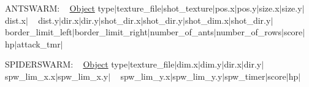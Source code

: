 ANTSWARM\+: ~\newline
 \mbox{\hyperlink{classObject}{Object}} type$\vert$texture\+\_\+file$\vert$shot\+\_\+texture$\vert$pos.x$\vert$pos.y$\vert$size.x$\vert$size.y$\vert$dist.x$\vert$ ~\newline
 dist.\+y$\vert$dir.x$\vert$dir.y$\vert$shot\+\_\+dir.x$\vert$shot\+\_\+dir.y$\vert$shot\+\_\+dim.x$\vert$shot\+\_\+dir.y$\vert$ ~\newline
 border\+\_\+limit\+\_\+left$\vert$border\+\_\+limit\+\_\+right$\vert$number\+\_\+of\+\_\+ants$\vert$number\+\_\+of\+\_\+rows$\vert$score$\vert$hp$\vert$attack\+\_\+tmr$\vert$ ~\newline


SPIDERSWARM\+: ~\newline
 \mbox{\hyperlink{classObject}{Object}} type$\vert$texture\+\_\+file$\vert$dim.x$\vert$dim.y$\vert$dir.x$\vert$dir.y$\vert$spw\+\_\+lim\+\_\+x.x$\vert$spw\+\_\+lim\+\_\+x.y$\vert$ ~\newline
 spw\+\_\+lim\+\_\+y.\+x$\vert$spw\+\_\+lim\+\_\+y.y$\vert$spw\+\_\+timer$\vert$score$\vert$hp$\vert$ ~\newline
 
